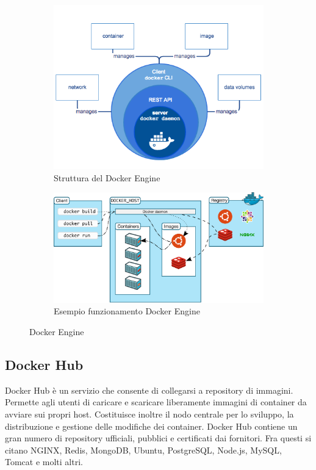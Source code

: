 \begin{figure}[h]
    \begin{subfigure}{0.4\textwidth}
        \centering
        \includegraphics[width=\textwidth]{immagini/engine-components-flow.png}
        \caption{Struttura del Docker Engine}
        \label{fig:docker_engine_a}
    \end{subfigure}
    \begin{subfigure}{0.6\textwidth}
        \centering
        \includegraphics[width=\textwidth]{immagini/architecture.png}
        \caption{Esempio funzionamento Docker Engine}
        \label{fig:docker_engine_b}
    \end{subfigure}
    \caption{Docker Engine}
    \label{fig:docker_engine}
\end{figure}

\subsection{Docker Hub}\label{docker-hub}
Docker Hub è un servizio che consente di collegarsi a repository di immagini. Permette agli utenti di caricare e scaricare liberamente immagini di container da avviare sui propri host. Costituisce inoltre il nodo centrale per lo sviluppo, la distribuzione e gestione delle modifiche dei container. Docker Hub contiene un gran numero di repository ufficiali, pubblici e certificati dai fornitori. Fra questi si citano NGINX, Redis, MongoDB, Ubuntu, PostgreSQL, Node.js, MySQL, Tomcat e molti altri.


